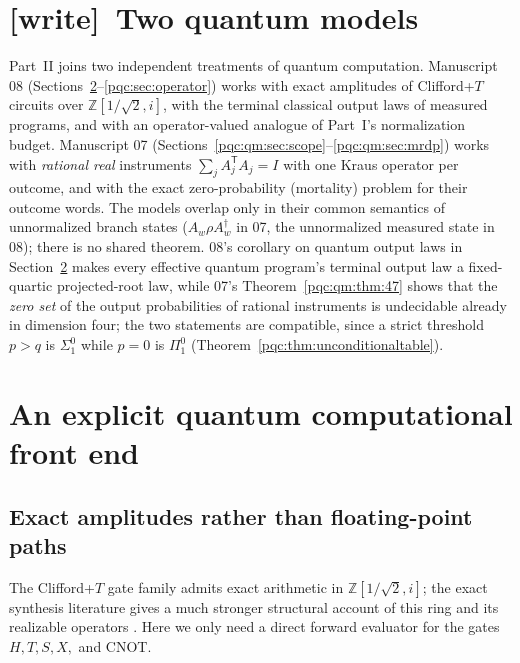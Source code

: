 \documentclass[11pt,letterpaper]{article}
\numberwithin{equation}{section}
\theoremstyle{definition}
\theoremstyle{remark}
\newcommand{\Z}{\mathbb Z}
\newcommand{\wtag}{\textup{[write]}}
\newcommand{\sigone}{\Sigma^0_1}
\newcommand{\pione}{\Pi^0_1}
\begin{document}
\section{\wtag\ Two quantum models}
\label{pqc:conv:partII}
Part~II joins two independent treatments of quantum computation. Manuscript
08 (Sections~\ref{pqc:sec:quantum}--\ref{pqc:sec:operator}) works with exact
amplitudes of Clifford+$T$ circuits over $\Z[1/\sqrt2,i]$, with the terminal
classical output laws of measured programs, and with an operator-valued
analogue of Part~I's normalization budget. Manuscript 07
(Sections~\ref{pqc:qm:sec:scope}--\ref{pqc:qm:sec:mrdp}) works with
\emph{rational real} instruments $\sum_jA_j^{\mathsf T}A_j=I$ with one Kraus
operator per outcome, and with the exact zero-probability (mortality)
problem for their outcome words. The models overlap only in their common
semantics of unnormalized branch states ($A_w\rho A_w^\dagger$ in 07, the
unnormalized measured state in 08); there is no shared theorem. 08's
corollary on quantum output laws in Section~\ref{pqc:sec:quantum} makes every effective quantum program's
terminal output law a fixed-quartic projected-root law, while 07's
Theorem~\ref{pqc:qm:thm:47} shows that the \emph{zero set} of the output
probabilities of rational instruments is undecidable already in dimension
four; the two statements are compatible, since a strict threshold $p>q$ is
$\sigone$ while $p=0$ is $\pione$ (Theorem~\ref{pqc:thm:unconditionaltable}).

\section{An explicit quantum computational front end}\label{pqc:sec:quantum}

\subsection{Exact amplitudes rather than floating-point paths}
The Clifford+$T$ gate family admits exact arithmetic in
$\Z[1/\sqrt2,i]$; the exact synthesis literature gives a much stronger
structural account of this ring and its realizable operators
\cite{giles-selinger}. Here we only need a direct forward evaluator for the
gates $H,T,S,X,$ and CNOT.
\end{document}
